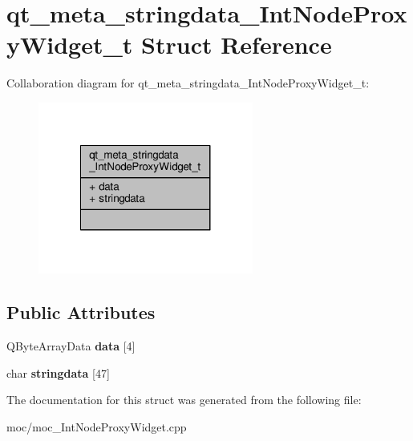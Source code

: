 \hypertarget{structqt__meta__stringdata___int_node_proxy_widget__t}{\section{qt\-\_\-meta\-\_\-stringdata\-\_\-\-Int\-Node\-Proxy\-Widget\-\_\-t Struct Reference}
\label{structqt__meta__stringdata___int_node_proxy_widget__t}
}


Collaboration diagram for qt\-\_\-meta\-\_\-stringdata\-\_\-\-Int\-Node\-Proxy\-Widget\-\_\-t\-:
\nopagebreak
\begin{figure}[H]
\begin{center}
\leavevmode
\includegraphics[width=200pt]{structqt__meta__stringdata___int_node_proxy_widget__t__coll__graph}
\end{center}
\end{figure}
\subsection*{Public Attributes}
\begin{DoxyCompactItemize}
\item 
\hypertarget{structqt__meta__stringdata___int_node_proxy_widget__t_a954f841f8a4b7cda8413adb11a00a41b}{Q\-Byte\-Array\-Data {\bfseries data} \mbox{[}4\mbox{]}}\label{structqt__meta__stringdata___int_node_proxy_widget__t_a954f841f8a4b7cda8413adb11a00a41b}

\item 
\hypertarget{structqt__meta__stringdata___int_node_proxy_widget__t_a5ef7c5db4f39c23dc9ef7c40d19869c0}{char {\bfseries stringdata} \mbox{[}47\mbox{]}}\label{structqt__meta__stringdata___int_node_proxy_widget__t_a5ef7c5db4f39c23dc9ef7c40d19869c0}

\end{DoxyCompactItemize}


The documentation for this struct was generated from the following file\-:\begin{DoxyCompactItemize}
\item 
moc/moc\-\_\-\-Int\-Node\-Proxy\-Widget.\-cpp\end{DoxyCompactItemize}
